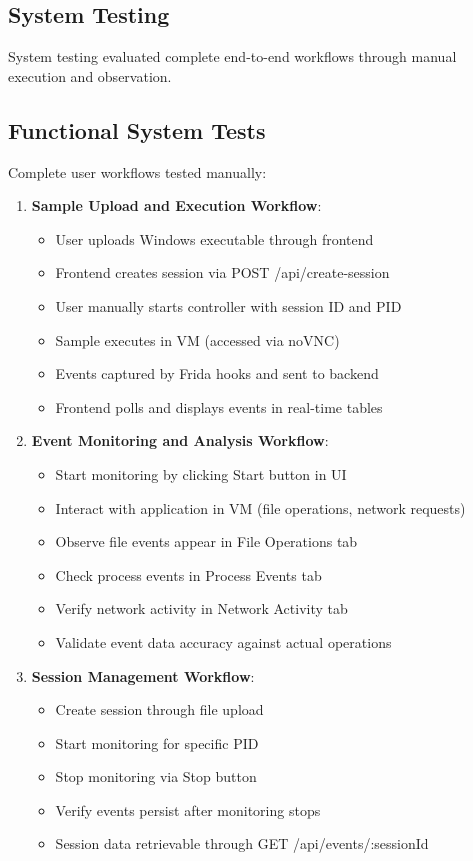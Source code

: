 \begin{itemize}
\section{System Testing}

System testing evaluated complete end-to-end workflows through manual execution and observation.

\subsection{Functional System Tests}

Complete user workflows tested manually:

\begin{enumerate}
    \item \textbf{Sample Upload and Execution Workflow}:
    \begin{itemize}
        \item User uploads Windows executable through frontend
        \item Frontend creates session via POST /api/create-session
        \item User manually starts controller with session ID and PID
        \item Sample executes in VM (accessed via noVNC)
        \item Events captured by Frida hooks and sent to backend
        \item Frontend polls and displays events in real-time tables
    \end{itemize}
    
    \item \textbf{Event Monitoring and Analysis Workflow}:
    \begin{itemize}
        \item Start monitoring by clicking Start button in UI
        \item Interact with application in VM (file operations, network requests)
        \item Observe file events appear in File Operations tab
        \item Check process events in Process Events tab
        \item Verify network activity in Network Activity tab
        \item Validate event data accuracy against actual operations
    \end{itemize}
    
    \item \textbf{Session Management Workflow}:
    \begin{itemize}
        \item Create session through file upload
        \item Start monitoring for specific PID
        \item Stop monitoring via Stop button
        \item Verify events persist after monitoring stops
        \item Session data retrievable through GET /api/events/:sessionId
    \end{itemize}


\end{enumerate}
\end{itemize}
